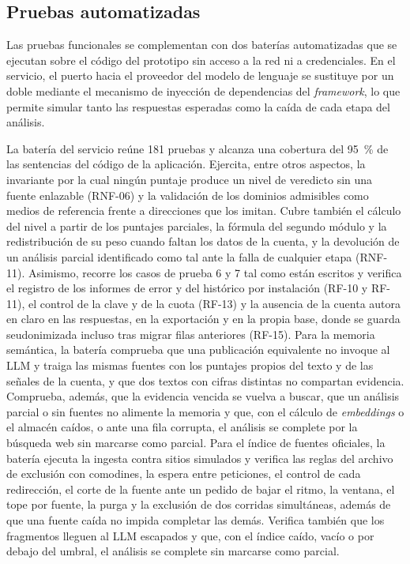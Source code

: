 \subsection{Pruebas automatizadas}
\label{sec:pruebas-automatizadas}

Las pruebas funcionales se complementan con dos baterías automatizadas que se ejecutan sobre el código del prototipo sin acceso a la red ni a credenciales. En el servicio, el puerto hacia el proveedor del modelo de lenguaje se sustituye por un doble mediante el mecanismo de inyección de dependencias del \textit{framework}, lo que permite simular tanto las respuestas esperadas como la caída de cada etapa del análisis.

La batería del servicio reúne 181 pruebas y alcanza una cobertura del 95~\% de las sentencias del código de la aplicación. Ejercita, entre otros aspectos, la invariante por la cual ningún puntaje produce un nivel de veredicto sin una fuente enlazable (RNF-06) y la validación de los dominios admisibles como medios de referencia frente a direcciones que los imitan. Cubre también el cálculo del nivel a partir de los puntajes parciales, la fórmula del segundo módulo y la redistribución de su peso cuando faltan los datos de la cuenta, y la devolución de un análisis parcial identificado como tal ante la falla de cualquier etapa (RNF-11). Asimismo, recorre los casos de prueba 6 y 7 tal como están escritos y verifica el registro de los informes de error y del histórico por instalación (RF-10 y RF-11), el control de la clave y de la cuota (RF-13) y la ausencia de la cuenta autora en claro en las respuestas, en la exportación y en la propia base, donde se guarda seudonimizada incluso tras migrar filas anteriores (RF-15). Para la memoria semántica, la batería comprueba que una publicación equivalente no invoque al LLM y traiga las mismas fuentes con los puntajes propios del texto y de las señales de la cuenta, y que dos textos con cifras distintas no compartan evidencia. Comprueba, además, que la evidencia vencida se vuelva a buscar, que un análisis parcial o sin fuentes no alimente la memoria y que, con el cálculo de \textit{embeddings} o el almacén caídos, o ante una fila corrupta, el análisis se complete por la búsqueda web sin marcarse como parcial. Para el índice de fuentes oficiales, la batería ejecuta la ingesta contra sitios simulados y verifica las reglas del archivo de exclusión con comodines, la espera entre peticiones, el control de cada redirección, el corte de la fuente ante un pedido de bajar el ritmo, la ventana, el tope por fuente, la purga y la exclusión de dos corridas simultáneas, además de que una fuente caída no impida completar las demás. Verifica también que los fragmentos lleguen al LLM escapados y que, con el índice caído, vacío o por debajo del umbral, el análisis se complete sin marcarse como parcial.

